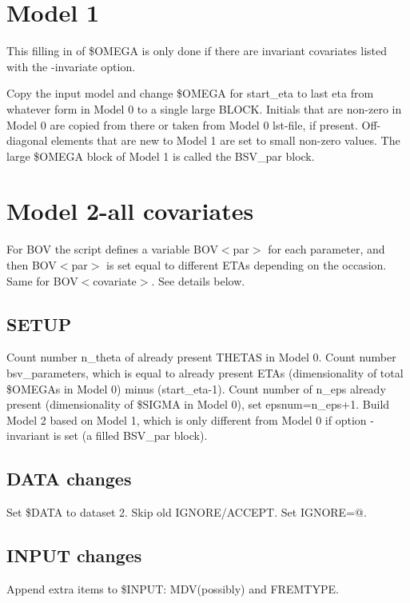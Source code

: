 \section{Model 1}
This filling in of \$OMEGA is only done if there are invariant covariates listed with the -invariate option.

Copy the input model and change \$OMEGA for start\_eta to last eta from whatever form in Model 0 to a single large BLOCK. 
Initials that are non-zero in Model 0 are copied from there or taken from Model 0 lst-file, if present. 
Off-diagonal elements that are new to Model 1 are set to small non-zero values.
The large \$OMEGA block of Model 1 is called the BSV\_par block.

\section{Model 2-all covariates}

For BOV the script defines a variable BOV$<$par$>$ for each parameter, and then BOV$<$par$>$ is set equal to different ETAs depending on the occasion. Same for BOV$<$covariate$>$. See details below. 

\subsection{SETUP}
Count number n\_theta of already present THETAS in Model 0. Count number bsv\_parameters, which is
equal to already present ETAs 
(dimensionality of total \$OMEGAs in Model 0) minus (start\_eta-1). 
Count number of n\_eps already present (dimensionality of \$SIGMA in Model 0), set epsnum=n\_eps+1.
Build Model 2 based on Model 1, which is only different from Model 0 if option -invariant is set (a filled BSV\_par block).

\subsection{DATA changes}
Set \$DATA to dataset 2. Skip old IGNORE/ACCEPT. Set IGNORE=@.

\subsection{INPUT changes}
Append extra items to \$INPUT: MDV(possibly) and FREMTYPE.

